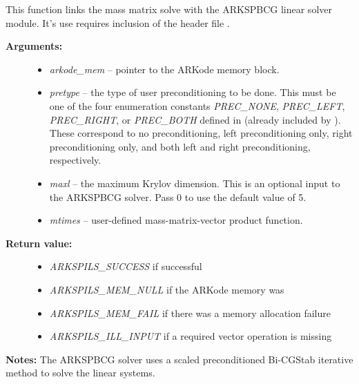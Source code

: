 \documentclass[letterpaper,10pt,english]{sphinxmanual}
\begin{document}

\begin{fulllineitems}
\label{c_interface/User_callable:ARKMassSpbcg}
This function links the mass matrix solve with the ARKSPBCG linear
solver module.  It's use requires inclusion of the header file
.
\begin{description}
\item[{\textbf{Arguments:}}] \leavevmode\begin{itemize}
\item {} 
\emph{arkode\_mem} -- pointer to the ARKode memory block.

\item {} 
\emph{pretype} -- the type of user preconditioning to be done.  This
must be one of the four enumeration constants \emph{PREC\_NONE},
\emph{PREC\_LEFT}, \emph{PREC\_RIGHT}, or \emph{PREC\_BOTH} defined in
 (already included by
). These correspond to no preconditioning,
left preconditioning only, right preconditioning only, and
both left and right preconditioning, respectively.

\item {} 
\emph{maxl} -- the maximum Krylov dimension. This is an optional input
to the ARKSPBCG solver. Pass 0 to use the default value of 5.

\item {} 
\emph{mtimes} -- user-defined mass-matrix-vector product function.

\end{itemize}

\item[{\textbf{Return value:}}] \leavevmode\begin{itemize}
\item {} 
\emph{ARKSPILS\_SUCCESS} if successful

\item {} 
\emph{ARKSPILS\_MEM\_NULL}  if the ARKode memory was 

\item {} 
\emph{ARKSPILS\_MEM\_FAIL}  if there was a memory allocation failure

\item {} 
\emph{ARKSPILS\_ILL\_INPUT} if a required vector operation is missing

\end{itemize}

\end{description}

\textbf{Notes:} The ARKSPBCG solver uses a scaled preconditioned Bi-CGStab
iterative method to solve the linear systems.

\end{fulllineitems}
\end{document}
